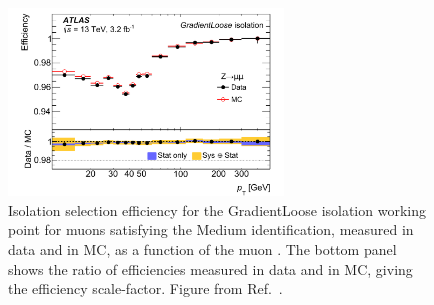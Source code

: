 \begin{figure}[!htb]
    \begin{center}
        \includegraphics[width=0.65\textwidth]{figures/chapter3/iso_eff_muon}
        \caption{
            Isolation selection efficiency for the GradientLoose isolation working point for muons satisfying
            the Medium identification,
            measured in data and in MC, as a function of the muon \pT.
            The bottom panel shows the ratio of efficiencies measured in data and in MC, giving
            the efficiency scale-factor.
            Figure from Ref.~\cite{Aad:2016jkr}.
        }
        \label{fig:muon_iso_eff}
    \end{center}
\end{figure}

\FloatBarrier
